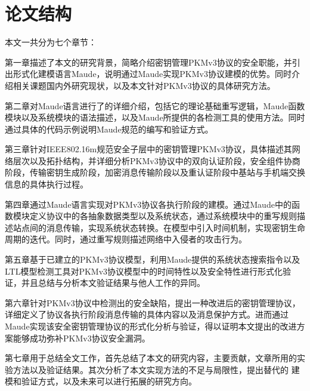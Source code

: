 \section{论文结构}

本文一共分为七个章节：

第一章描述了本文的研究背景，简略介绍密钥管理PKMv3协议的安全职能，并引出形式化建模语言Maude，说明通过Maude实现PKMv3协议建模的优势。同时介绍相关课题国内外研究现状，以及本文针对PKMv3协议的具体研究方法。

第二章对Maude语言进行了的详细介绍，包括它的理论基础重写逻辑，Maude函数模块以及系统模块的语法描述，以及Maude所提供的各检测工具的使用方法。同时通过具体的代码示例说明Maude规范的编写和验证方式。

第三章针对IEEE802.16m规范安全子层中的密钥管理PKMv3协议，具体描述其网络层次以及拓扑结构，并详细分析PKMv3协议中的双向认证阶段，安全组件协商阶段，传输密钥生成阶段，加密消息传输阶段以及重认证阶段中基站与手机端交换信息的具体执行过程。

第四章通过Maude语言实现对PKMv3协议各执行阶段的建模。通过Maude中的函数模块定义协议中的各抽象数据类型以及系统状态，通过系统模块中的重写规则描述站点间的消息传输，实现系统状态转换。在模型中引入时间机制，实现密钥生命周期的迭代。同时，通过重写规则描述网络中入侵者的攻击行为。

第五章基于已建立的PKMv3协议模型，利用Maude提供的系统状态搜索指令以及LTL模型检测工具对PKMv3协议模型中的时间特性以及安全特性进行形式化验证，并且总结与分析本文验证结果与他人工作的异同。

第六章针对PKMv3协议中检测出的安全缺陷，提出一种改进后的密钥管理协议，详细定义了协议各执行阶段消息传输的具体内容以及消息保护方式。进而通过Maude实现该安全密钥管理协议的形式化分析与验证，得以证明本文提出的改进方案能够成功弥补PKMv3协议安全漏洞。

第七章用于总结全文工作，首先总结了本文的研究内容，主要贡献，文章所用的实验方法以及验证结果。其次分析了本文实现方法的不足与局限性，提出替代的 建模和验证方式，以及未来可以进行拓展的研究方向。